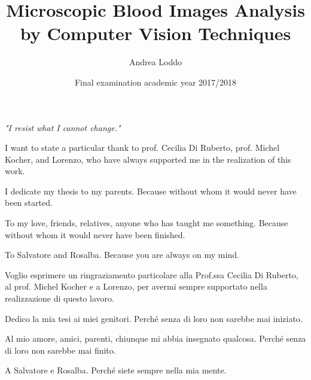 \documentclass[final,a4paper,12pt,english]{UnicaPhdThesis3}
\title{Microscopic Blood Images Analysis by Computer Vision Techniques}
\author{Andrea Loddo}
\date{Final examination academic year 2017/2018}
\begin{document}
\maketitle
\clearpage\mbox{}\clearpage

\begin{flushright}
	\null{}
	\textit{"I resist what I cannot change."}
	\null

\end{flushright}

\noindent
I want to state a particular thank to prof. Cecilia Di Ruberto, prof. Michel Kocher, and Lorenzo, who have always supported me in the realization of this work.

\noindent
I dedicate my thesis to my parents. Because without whom it would never have been started. 

\noindent
To my love, friends, relatives, anyone who has taught me something. Because without whom it would never have been finished.

\noindent
To Salvatore and Rosalba.
Because you are always on my mind. \newline

\noindent
Voglio esprimere un ringraziamento particolare alla Prof.ssa Cecilia Di Ruberto, al prof. Michel Kocher e a Lorenzo, per avermi sempre supportato nella realizzazione di questo lavoro.

\noindent
Dedico la mia tesi ai miei genitori. Perch\'{e} senza di loro non sarebbe mai iniziato.

\noindent
Al mio amore, amici, parenti, chiunque mi abbia insegnato qualcosa. Perch\'{e} senza di loro non sarebbe mai finito.

\noindent
A Salvatore e Rosalba. Perch\'{e} siete sempre nella mia mente.
\end{document}
